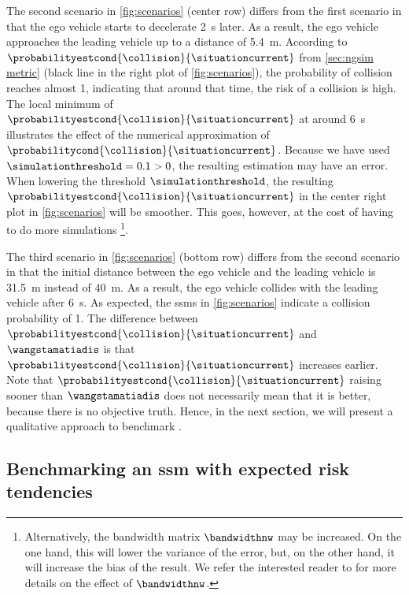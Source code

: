 The second scenario in \cref{fig:scenarios} (center row) differs from the first scenario in that the ego vehicle starts to decelerate \SI{2}{\second} later.
As a result, the ego vehicle approaches the leading vehicle up to a distance of \SI{5.4}{\meter}.
According to $\probabilityestcond{\collision}{\situationcurrent}$ from \cref{sec:ngsim metric} (black line in the right plot of \cref{fig:scenarios}), the probability of collision reaches almost 1, indicating that around that time, the risk of a collision is high.
The local minimum of $\probabilityestcond{\collision}{\situationcurrent}$ at around \SI{6}{\second} illustrates the effect of the numerical approximation of $\probabilitycond{\collision}{\situationcurrent}$.
Because we have used $\simulationthreshold=0.1>0$, the resulting estimation may have an error. 
When lowering the threshold $\simulationthreshold$, the resulting $\probabilityestcond{\collision}{\situationcurrent}$ in the center right plot in \cref{fig:scenarios} will be smoother. 
This goes, however, at the cost of having to do more simulations \footnote{Alternatively, the bandwidth matrix $\bandwidthnw$ may be increased. 
	On the one hand, this will lower the variance of the error, but, on the other hand, it will increase the bias of the result.
	We refer the interested reader to \autocite{chen2017tutorial} for more details on the effect of $\bandwidthnw$.}.

The third scenario in \cref{fig:scenarios} (bottom row) differs from the second scenario in that the initial distance between the ego vehicle and the leading vehicle is \SI{31.5}{\meter} instead of \SI{40}{\meter}. 
As a result, the ego vehicle collides with the leading vehicle after \SI{6}{\second}.
As expected, the \acp{ssm} in \cref{fig:scenarios} indicate a collision probability of 1.
The difference between $\probabilityestcond{\collision}{\situationcurrent}$ and $\wangstamatiadis$ is that $\probabilityestcond{\collision}{\situationcurrent}$ increases earlier. 
\cstartb Note that $\probabilityestcond{\collision}{\situationcurrent}$ raising sooner than $\wangstamatiadis$ does not necessarily mean that it is better, because there is no objective truth. 
Hence, in the next section, we will present a qualitative approach to benchmark . \cendb



\subsection{Benchmarking an \acs{ssm} with expected risk tendencies}
\label{sec:tendencies}

